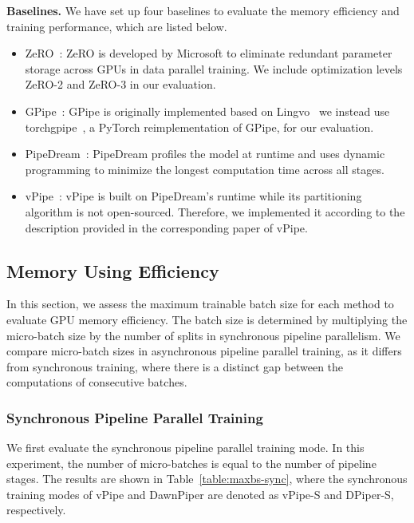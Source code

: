 \textbf{Baselines.}
We have set up four baselines to evaluate the memory efficiency and training performance, which are listed below.
\begin{itemize}
  \item ZeRO~\cite{rajbhandariZeROMemoryOptimizations2020}: ZeRO is developed by Microsoft
  to eliminate redundant parameter storage across GPUs in data parallel training.
  We include optimization levels ZeRO-2 and ZeRO-3 in our evaluation.
  \item GPipe~\cite{huangGpipeEfficientTraining2019}: GPipe is originally implemented based on Lingvo~\cite{shen2019lingvo}
   we instead use torchgpipe~\cite{kimTorchgpipeOntheflyPipeline2020}, a PyTorch reimplementation of GPipe, for our evaluation.
  \item PipeDream~\cite{narayananPipeDreamGeneralizedPipeline2019}: PipeDream profiles the model at runtime
  and uses dynamic programming to minimize the longest computation time across all stages.
  \item vPipe~\cite{zhaoVPipeVirtualizedAcceleration2022}: vPipe is built on PipeDream’s runtime
  while its partitioning algorithm is not open-sourced.
  Therefore, we implemented it according to the description provided in the corresponding paper of vPipe.
\end{itemize}

\subsection{Memory Using Efficiency}
In this section, we assess the maximum trainable batch size
for each method to evaluate GPU memory efficiency.
The batch size is determined by multiplying the micro-batch size
by the number of splits in synchronous pipeline parallelism.
We compare micro-batch sizes in asynchronous pipeline parallel training,
as it differs from synchronous training,
where there is a distinct gap between the computations of consecutive batches.

\subsubsection{Synchronous Pipeline Parallel Training}
We first evaluate the synchronous pipeline parallel training mode.
In this experiment, the number of micro-batches is equal to the number of pipeline stages.
The results are shown in Table~\ref{table:maxbs-sync},
where the synchronous training modes of vPipe and DawnPiper are denoted as vPipe-S and DPiper-S, respectively.


